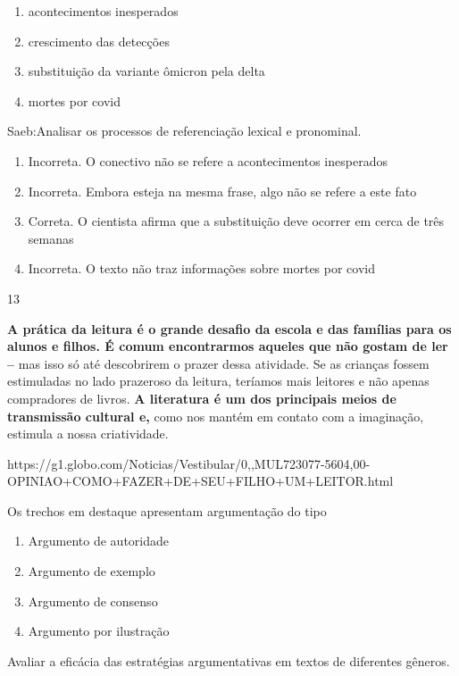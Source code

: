 {{\begin{itemize}
\begin{itemize}
\begin{enumerate}
\def\labelenumi{\alph{enumi})}
\item
  acontecimentos inesperados
\item
  crescimento das detecções
\item
  substituição da variante ômicron pela delta
\item
  mortes por covid
\end{enumerate}

Saeb:Analisar os processos de referenciação lexical e pronominal.

\begin{enumerate}
\def\labelenumi{\arabic{enumi}.}
\item
  Incorreta. O conectivo não se refere a acontecimentos inesperados
\item
  Incorreta. Embora esteja na mesma frase, algo não se refere a este
  fato
\item
  Correta. O cientista afirma que a substituição deve ocorrer em cerca
  de três semanas
\item
  Incorreta. O texto não traz informações sobre mortes por covid
\end{enumerate}

\num{13}

\textbf{A prática da leitura é o grande desafio da escola e das famílias
para os alunos e filhos. É comum encontrarmos aqueles que não gostam de
ler --} mas isso só até descobrirem o prazer dessa atividade. Se as
crianças fossem estimuladas no lado prazeroso da leitura, teríamos mais
leitores e não apenas compradores de livros. \textbf{A literatura é um
dos principais meios de transmissão cultural e,} como nos mantém em
contato com a imaginação, estimula a nossa criatividade.

https://g1.globo.com/Noticias/Vestibular/0,,MUL723077-5604,00-OPINIAO+COMO+FAZER+DE+SEU+FILHO+UM+LEITOR.html

Os trechos em destaque apresentam argumentação do tipo

\begin{enumerate}
\def\labelenumi{\alph{enumi})}
\item
  Argumento de autoridade
\item
  Argumento de exemplo
\item
  Argumento de consenso
\item
  Argumento por ilustração
\end{enumerate}

Avaliar a eficácia das estratégias argumentativas em textos de
diferentes gêneros.


\end{itemize}
\end{itemize}}}
